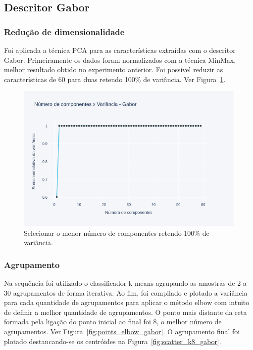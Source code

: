 \documentclass[a4paper, 12 pt, conference]{ieeeconf}  %
\begin{document}
\subsection{Descritor Gabor}
\subsubsection{Redução de dimensionalidade}
Foi aplicada a técnica PCA para as características extraídas com o descritor Gabor. Primeiramente os dados  foram normalizados com a técnica MinMax, melhor resultado obtido no experimento anterior. Foi possível reduzir as características de 60 para duas retendo 100\% de variância. Ver  Figura~\ref{fig:points_pca_gabor}.

\begin{figure}[!htbp]
	\centering
	\includegraphics[width=1.0\linewidth,clip=true,trim=0cm 0cm 0cm 0cm, keepaspectratio=true]{points_pca_gabor.png}
	\caption{Selecionar o menor número de componentes retendo 100\% de variância.}
	\label{fig:points_pca_gabor}
\end{figure}

\subsubsection{Agrupamento}
Na sequência foi utilizado o classificador k-means agrupando as amostras de 2 a 30 agrupamentos de forma iterativa. Ao fim, foi compilado e plotado a variância para cada quantidade de agrupamentos para aplicar o método elbow com intuito de definir a melhor quantidade de agrupamentos. O ponto mais distante da reta formada pela ligação do ponto inicial ao final foi 8, o melhor número de agrupamentos. Ver Figura~\ref{fig:points_elbow_gabor}. O agrupamento final foi plotado destancando-se os centróides na Figura~\ref{fig:scatter_k8_gabor}.
\end{document}
